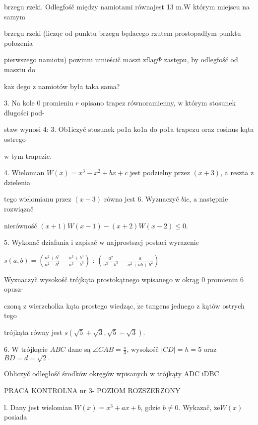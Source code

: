 \documentclass[a4paper,12pt]{article}
\begin{document}
brzegu rzeki. Odlegfośč między namiotami równajest 13 $\mathrm{m}. \mathrm{W}$ którym miejscu na samym

brzegu rzeki (liczqc od punktu brzegu będacego rzutem prostopadłym punktu połozenia

pierwszego namiotu) powinni umieścič maszt $\mathrm{z}\mathrm{f}\mathrm{l}\mathrm{a}\mathrm{g}\Phi$ zastępu, by odlegfośč od masztu do

$\mathrm{k}\mathrm{a}\dot{\mathrm{z}}$ dego $\mathrm{z}$ namiotów była taka sama?

3. Na kole $0$ promieniu $r$ opisano trapez równoramienny, $\mathrm{w}$ którym stosunek dlugości pod-

staw wynosi 4: 3. Ob1iczyč stosunek po1a ko1a do po1a trapezu oraz cosinus kąta ostrego

$\mathrm{w}$ tym trapezie.

4. Wielomian $W(x) =x^{3}-x^{2}+bx+c$ jest podzielny przez $(x+3)$, a reszta $\mathrm{z}$ dzielenia

tego wielomianu przez $(x-3)$ równa jest 6. Wyznaczyč $b\mathrm{i} c$, a następnie rozwiązač

nierównośč $(x+1)W(x-1)-(x+2)W(x-2)\leq 0.$

5. Wykonač dziafania $\mathrm{i}$ zapisač $\mathrm{w}$ najprostszej postaci wyrazenie

$s(a,b)= (\displaystyle \frac{a^{2}+b^{2}}{a^{2}-b^{2}}-\frac{a^{3}+b^{3}}{a^{3}-b^{3}})$ : $(\displaystyle \frac{a^{2}}{a^{3}-b^{3}}-\frac{a}{a^{2}+ab+b^{2}})$

Wyznaczyč wysokośč trójkąta prostokątnego wpisanego $\mathrm{w}$ okrąg $0$ promieniu 6 opusz-

czoną $\mathrm{z}$ wierzcholka kąta prostego wiedząc, $\dot{\mathrm{z}}\mathrm{e}$ tangens jednego $\mathrm{z}$ kątów ostrych tego

trójkąta równy jest $s(\sqrt{5}+\sqrt{3},\sqrt{5}-\sqrt{3}).$

6. $\mathrm{W}$ trójkącie $ABC$ dane są $\angle CAB= \displaystyle \frac{\pi}{3}$, wysokośč $|CD| =h=5$ oraz $BD=d=\sqrt{2}.$

Obliczyč odległośč środków okręgów wpisanych $\mathrm{w}$ trójkąty ADC $\mathrm{i}\mathrm{D}\mathrm{B}\mathrm{C}.$





PRACA KONTROLNA nr 3- POZIOM ROZSZERZONY

l. Dany jest wielomian $W(x) = x^{3}+ax+b$, gdzie $b \neq 0$. Wykazač, $\dot{\mathrm{z}}\mathrm{e} W(x)$ posiada
\end{document}
